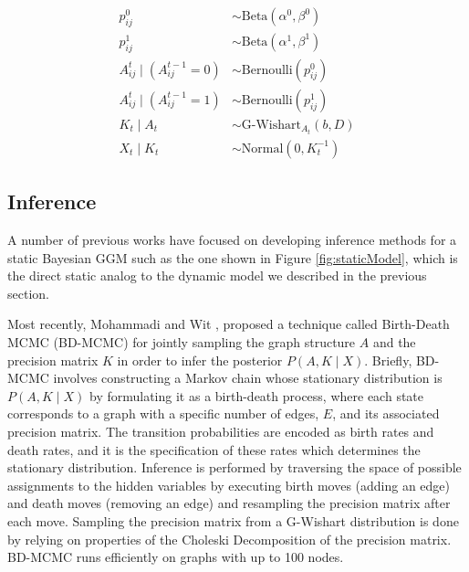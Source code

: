 \documentclass{article}
\begin{document}
\begin{align*}
p_{ij}^0 &\sim \text{Beta}(\alpha^0,\beta^0) \\
p_{ij}^1 &\sim \text{Beta}(\alpha^1,\beta^1) \\
A_{ij}^t \mid (A_{ij}^{t-1} = 0) &\sim \text{Bernoulli}(p_{ij}^0) \\
A_{ij}^t \mid (A_{ij}^{t-1} = 1) &\sim \text{Bernoulli}(p_{ij}^1) \\
K_t \mid A_t &\sim \text{G-Wishart}_{A_t}(b,D) \\ 
X_t \mid K_t &\sim \text{Normal}(0,K_t^{-1})
\end{align*}


\subsection{Inference}
\label{sec:inference}
A number of previous works have focused on developing inference methods for a static Bayesian GGM such as the one shown in Figure \ref{fig:staticModel}, which is the direct static analog to the dynamic model we described in the previous section.

Most recently, Mohammadi and Wit \cite{mohammadi2012efficient}, proposed a technique called Birth-Death MCMC (BD-MCMC) for jointly sampling the graph structure $A$ and the precision matrix $K$ in order to infer the posterior $P(A,K \mid X)$. Briefly, BD-MCMC involves constructing a Markov chain whose stationary distribution is $P(A,K \mid X)$ by formulating it as a birth-death process, where each state corresponds to a graph with a specific number of edges, $E$, and its associated precision matrix. The transition probabilities are encoded as birth rates and death rates, and it is the specification of these rates which determines the stationary distribution. Inference is performed by traversing the space of possible assignments to the hidden variables by executing birth moves (adding an edge) and death moves (removing an edge) and resampling the precision matrix after each move. Sampling the precision matrix from a G-Wishart distribution is done by relying on properties of the Choleski Decomposition of the precision matrix. BD-MCMC runs efficiently on graphs with up to 100 nodes.
\end{document}
